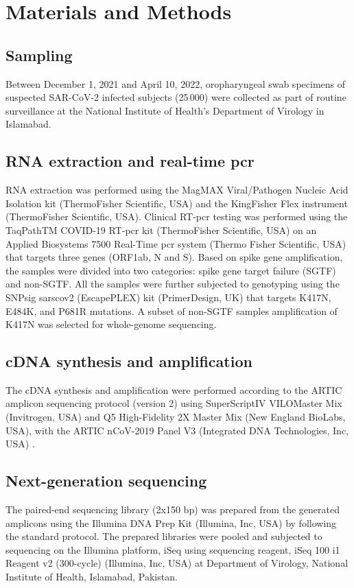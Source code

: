\section{Materials and Methods}\label{sec-mm}

\subsection{Sampling}\label{2:mm-sampling}
Between December 1, 2021 and April 10, 2022, oropharyngeal swab specimens of suspected SAR-CoV-2 infected subjects (25\,000) were collected as part of routine surveillance at the National Institute of Health's Department of Virology in Islamabad.


\subsection{RNA extraction and real-time \gls{pcr}}\label{2:mm-pcr}
RNA extraction was performed using the MagMAX Viral/Pathogen Nucleic Acid Isolation kit (ThermoFisher Scientific, USA) and the KingFisher Flex instrument (ThermoFisher Scientific, USA).
Clinical RT-\gls{pcr} testing was performed using the TaqPathTM COVID-19 RT-\gls{pcr} kit (ThermoFisher Scientific, USA) on an Applied Biosystems 7500 Real-Time \gls{pcr} system (Thermo Fisher Scientific, USA) that targets three genes (ORF1ab, N and S).
Based on spike gene amplification, the samples were divided into two categories: spike gene target failure (SGTF) and non-SGTF.
All the samples were further subjected to genotyping using the SNPsig\textsuperscript{\textregistered} \gls{sarscov2} (EscapePLEX) kit (PrimerDesign, UK) that targets K417N, E484K, and P681R mutations.
A subset of non-SGTF samples amplification of K417N was selected for whole-genome sequencing.


\subsection{cDNA synthesis and amplification }\label{2:mm-amp}
The cDNA synthesis and amplification were performed according to the ARTIC amplicon sequencing protocol (version 2) using SuperScript\texttrademark IV VILO\texttrademark Master Mix (Invitrogen, USA) and Q5\textsuperscript{\textregistered} High-Fidelity 2X Master Mix (New England BioLabs, USA), with the ARTIC nCoV-2019 Panel V3 (Integrated DNA Technologies, Inc, USA) \citep{quick2020ncov}.


\subsection{Next-generation sequencing}\label{2:mm-seq}
The paired-end sequencing library (2x150 bp) was prepared from the generated amplicons using the Illumina DNA Prep Kit (Illumina, Inc, USA) by following the standard protocol.
The prepared libraries were pooled and subjected to sequencing on the Illumina platform, iSeq using sequencing reagent, iSeq 100 i1 Reagent v2 (300-cycle) (Illumina, Inc, USA) at Department of Virology, National Institute of Health, Islamabad, Pakistan.


